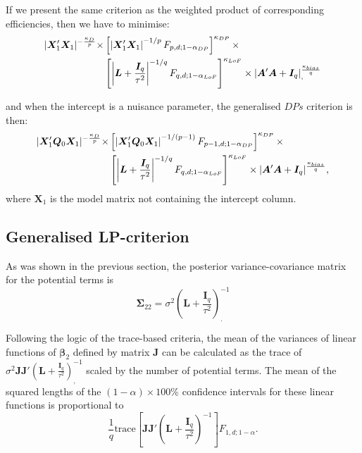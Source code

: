 If we present the same criterion as the weighted product of corresponding efficiencies, then we have to minimise:
\begin{align}
\label{eq::GDP_eff}
\vert\bm{X}'_{1}\bm{X}_{1}\vert^{-\frac{\kappa_{D}}{p}}\times & \left[\left|\bm{X}'_{1}\bm{X}_{1}\right|^{-1/p}F_{p,d;1-\alpha_{DP}}\right]^{\kappa_{DP}} \times \notag \\ &\left[\left|\bm{L}+\frac{\bm{I}_{q}}{\tau^{2}}\right|^{-1/q}F_{q,d;1-\alpha_{LoF}}\right]^{\kappa_{LoF}} \times |\bm{A}'\bm{A}+\bm{I}_{q}|^{\frac{\kappa_{bias}}{q}}_{,}
\end{align} 

and when the intercept is a nuisance parameter, the generalised $DPs$ criterion is then:
\begin{align}
\label{eq::GDPs_eff}
\vert\bm{X}'_1\bm{Q}_0\bm{X}_1\vert^{-\frac{\kappa_{D}}{p}}\times & \left[\left|\bm{X}'_1\bm{Q}_0\bm{X}_1\right|^{-1/(p-1)}F_{p-1,d;1-\alpha_{DP}}\right]^{\kappa_{DP}} \times \notag \\ &\left[\left|\bm{L}+\frac{\bm{I}_{q}}{\tau^{2}}\right|^{-1/q}F_{q,d;1-\alpha_{LoF}}\right]^{\kappa_{LoF}} \times |\bm{A}'\bm{A}+\bm{I}_{q}|^{\frac{\kappa_{bias}}{q}},
\end{align} 
where $\bm{X}_1$ is the model matrix not containing the intercept column.

\subsection{Generalised LP-criterion}
As was shown in the previous section, the posterior variance-covariance matrix for the potential terms is 
\begin{equation*}
\bm{\Sigma}_{22}=\sigma^{2}\left(\bm{L}+\frac{\bm{I}_{q}}{\tau^{2}}\right)_{.}^{-1}
\end{equation*}

Following the logic of the trace-based criteria, the mean of the variances of linear functions of $\bm{\beta}_2$ defined by matrix $\bm{J}$ can be calculated as the trace of $\sigma^2\bm{JJ}'\left(\bm{L}+\frac{\bm{I}_{q}}{\tau^{2}}\right)_{,}^{-1}$ scaled by the number of potential terms. The mean of the squared lengths of the $(1-\alpha)\times100\%$ confidence intervals  for these linear functions is proportional to
\begin{equation*}
\frac{1}{q}\mbox{trace}\left[\bm{JJ}'\left(\bm{L}+\frac{\bm{I}_{q}}{\tau^{2}}\right)^{-1}\right]F_{1,d;1-\alpha}.
\end{equation*} 

